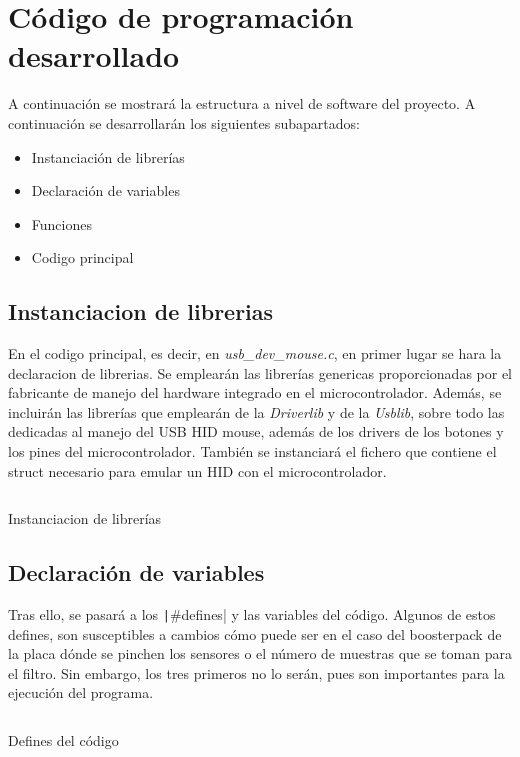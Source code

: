 \documentclass[a4paper,twoside]{article}
\begin{document}
\section{Código de programación desarrollado}
A continuación se mostrará la estructura a nivel de software del proyecto. A continuación se desarrollarán los siguientes subapartados:
\begin{itemize}
\item Instanciación de librerías
\item Declaración de variables
\item Funciones
\item Codigo principal
\end{itemize}


\newpage
\subsection{Instanciacion de librerias}
En el codigo principal, es decir, en \textit{usb\_dev\_mouse.c}, en primer lugar se hara la declaracion de librerias. Se emplearán las librerías genericas proporcionadas por el fabricante de manejo del hardware integrado en el microcontrolador. Además, se incluirán las librerías que emplearán de la \textit{Driverlib} y de la \textit{Usblib}, sobre todo las dedicadas al manejo del USB HID mouse, además de los drivers de los botones y los pines del microcontrolador. También se instanciará el fichero que contiene el struct necesario para emular un HID con el microcontrolador.
\begin{listing}[h!]
\inputminted[linenos,breaklines,frame=lines,framesep=2mm]{c}{codes/librerias.c}
\caption{Instanciacion de librerías}
\end{listing}

\newpage
\subsection{Declaración de variables}
Tras ello, se pasará a los \texttt|#defines| y las variables del código. Algunos de estos defines, son susceptibles a cambios cómo puede ser en el caso del boosterpack de la placa dónde se pinchen los sensores o el número de muestras que se toman para el filtro. Sin embargo, los tres primeros no lo serán, pues son importantes para la ejecución del programa.
\begin{listing}[h!]
\inputminted[linenos,breaklines,frame=lines,framesep=2mm]{c}{codes/defines.c}
\caption{Defines del código}
\end{listing}
\end{document}
